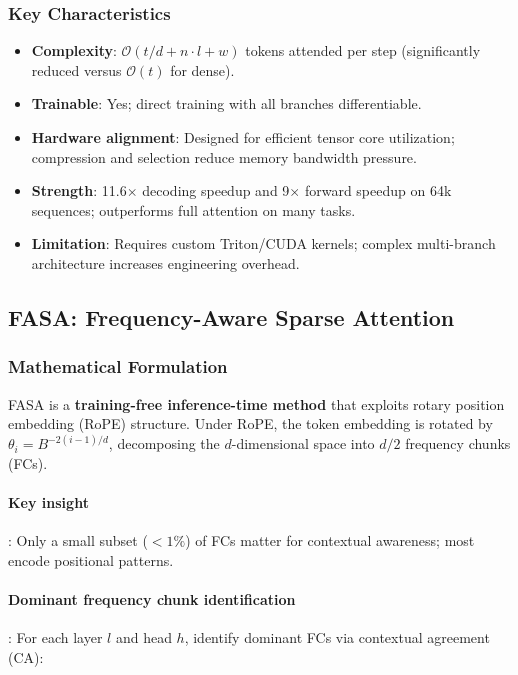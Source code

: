 \subsubsection{Key Characteristics}

\begin{itemize}[leftmargin=*]
    \item \textbf{Complexity}: $\mathcal{O}(t/d + n \cdot l + w)$ tokens attended per step (significantly reduced versus $\mathcal{O}(t)$ for dense).
    \item \textbf{Trainable}: Yes; direct training with all branches differentiable.
    \item \textbf{Hardware alignment}: Designed for efficient tensor core utilization; compression and selection reduce memory bandwidth pressure.
    \item \textbf{Strength}: 11.6$\times$ decoding speedup and 9$\times$ forward speedup on 64k sequences; outperforms full attention on many tasks.
    \item \textbf{Limitation}: Requires custom Triton/CUDA kernels; complex multi-branch architecture increases engineering overhead.
\end{itemize}

\subsection{FASA: Frequency-Aware Sparse Attention}

\subsubsection{Mathematical Formulation}

FASA \citep{wang_fasa_2026} is a \textbf{training-free inference-time method} that exploits rotary position embedding (RoPE) structure. Under RoPE, the token embedding is rotated by $\theta_i = B^{-2(i-1)/d}$, decomposing the $d$-dimensional space into $d/2$ frequency chunks (FCs).

\paragraph{Key insight}: Only a small subset ($ < 1\%$) of FCs matter for contextual awareness; most encode positional patterns.

\paragraph{Dominant frequency chunk identification}: For each layer $l$ and head $h$, identify dominant FCs via contextual agreement (CA):

